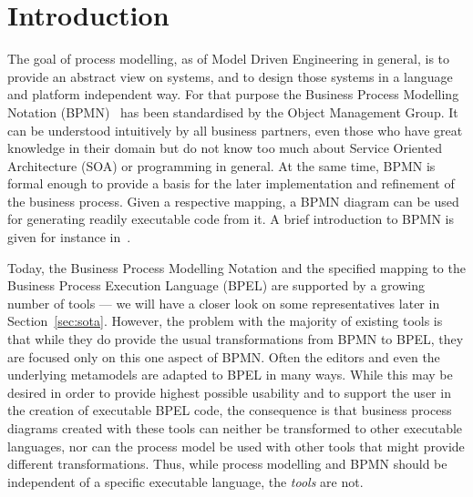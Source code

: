 \section{Introduction}
\label{sec:intro}

The goal of process modelling, as of Model Driven Engineering in general, is to provide an abstract view on systems, and to design those systems in a language and platform independent way.  For that purpose the Business Process Modelling Notation (BPMN)~\cite{omg2006business} has been standardised by the Object Management Group.  It can be understood intuitively by all business partners, even those who have great knowledge in their domain but do not know too much about Service Oriented Architecture (SOA) or programming in general.  At the same time, BPMN is formal enough to provide a basis for the later implementation and refinement of the business process.  Given a respective mapping, a BPMN diagram can be used for generating readily executable code from it.  A brief introduction to BPMN is given for instance in~\cite{white2004introduction}.

Today, the Business Process Modelling Notation and the specified mapping to the Business Process Execution Language (BPEL) are supported by a growing number of tools --- we will have a closer look on some representatives later in Section~\ref{sec:sota}.  However, the problem with the majority of existing tools is that while they do provide the usual transformations from BPMN to BPEL, they are focused only on this one aspect of BPMN.  Often the editors and even the underlying metamodels are adapted to BPEL in many ways.  While this may be desired in order to provide highest possible usability and to support the user in the creation of executable BPEL code, the consequence is that business process diagrams created with these tools can neither be transformed to other executable languages, nor can the process model be used with other tools that might provide different transformations.  Thus, while process modelling and BPMN should be independent of a specific executable language, the \emph{tools} are not.

